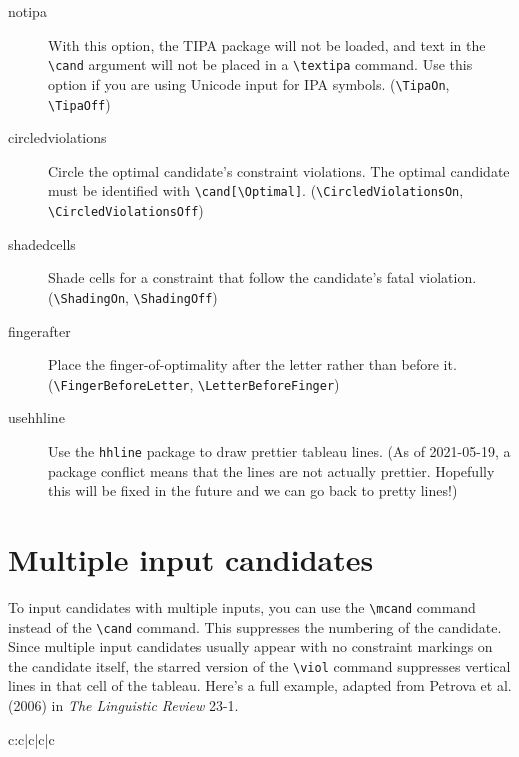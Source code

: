 \documentclass{article}
\begin{document}
\begin{description}
\item[notipa] With this option, the TIPA package will not be loaded, and text in the \verb+\cand+ argument will not be placed in a  \verb+\textipa+ command. Use this option if you are using Unicode input for IPA symbols. (\verb+\TipaOn+, \verb+\TipaOff+)
\item[circledviolations] Circle the optimal candidate's constraint violations. The optimal candidate must be identified with \verb+\cand[\Optimal]+. (\verb+\CircledViolationsOn+, \verb+\CircledViolationsOff+)
\item[shadedcells] Shade cells for a constraint that follow the candidate's fatal violation. (\verb+\ShadingOn+, \verb+\ShadingOff+)
\item[fingerafter] Place the finger-of-optimality after the letter rather than before it. (\verb+\FingerBeforeLetter+, \verb+\LetterBeforeFinger+)
\item[usehhline] Use the \verb+hhline+ package to draw prettier tableau lines. (As of 2021-05-19, a package conflict means that the lines are not actually prettier. Hopefully this will be fixed in the future and we can go back to pretty lines!)
\end{description}
\section{Multiple input candidates}
To input candidates with multiple inputs, you can use the \verb+\mcand+ command instead of the \verb+\cand+ command. This suppresses the numbering of the candidate.  Since multiple input candidates usually appear with no constraint markings on the candidate itself, the starred version of the \verb+\viol+ command suppresses vertical lines in that cell of the tableau.  Here's a full example, adapted from Petrova et al. (2006) in \emph{The Linguistic Review} 23-1.
\bigskip

\LetterBeforeFinger
\begin{tableau}{c:c|c|c|c}
\inp{}           
 \vio*{}	\vio*{}		\vio*{} \vio*{} \vio{}
	\vio{!*}	\vio{}		\vio{}	\vio{}	\vio{**}
    \vio{}		\vio{}		\vio{*!}	\vio{*}	\vio{***}
    \vio{}		\vio{}		\vio{}	\vio{**}	\vio{}
            \vio*{}		\vio*{}		\vio*{}	\vio*{}	\vio{}
            		\vio{*!}	\vio{}		\vio{}	\vio{}	\vio{*}
    \vio{}		\vio{}		\vio{}	\vio{*}	\vio{}
              \vio{}		\vio{}	\vio{!*}	\vio{**}	\vio{***}
            \vio*{}	\vio*{}		\vio*{} \vio*{} \vio{}  
            \vio{}		\vio{}		\vio{} \vio{**}	\vio{***}
    \vio{*!}		\vio{}		\vio{} \vio{}	\vio{}
     \vio{}		\vio{}	\vio{!*}	\vio{*}	\vio{}
\end{tableau}
\end{document}
